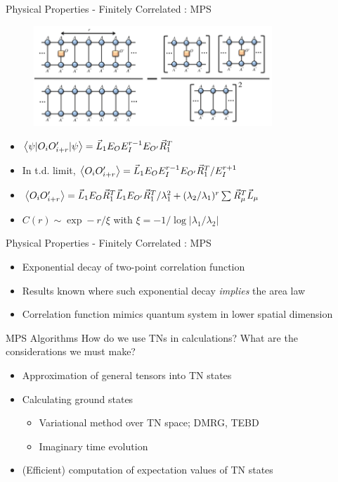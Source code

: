 \documentclass{beamer}
\begin{document}
\begin{frame}{Physical Properties - Finitely Correlated : MPS}
	\begin{figure}[h]
	\includegraphics[width=0.8\textwidth]{corr}
	\centering
	\end{figure}
\begin{itemize}
\item ${ \ev{\psi |O_{i}O^{\prime}_{i+r}|\psi }=\vec{L}_{1}E_{O}E_{I}^{r-1}E_{O^{\prime}} \vec{R}_{1}^{T}}$\\
	\item	In t.d. limit, ${ \ev{O_{i}O^{\prime}_{i+r}}=\vec{L}_{1}E_{O}E_{I}^{r-1}E_{O^{\prime}}\vec{R}_{1}^{T}/E_{I}^{r+1}}$
	\item ${ \ev{O_{i}O_{i+r}^{\prime}}=\vec{L}_{1}E_{O}\vec{R}_{1}^{T}\vec{L}_{1}E_{O^{\prime}}\vec{R}_{1}^{T}/\lambda _{1}^{2} +(\lambda _{2}/\lambda _{1})^{r}\sum_{}^{} \vec{R}^{T}_{\mu} \vec{L}_{\mu }}$
	\item ${ C(r)\sim \exp -r/\xi }$ with ${ \xi =-1  /\log{|\lambda _{1}/\lambda _{2}|}}$

\end{itemize}
\end{frame}

\begin{frame}{Physical Properties - Finitely Correlated : MPS}
	\begin{itemize}
	\item Exponential decay of two-point correlation function
	\item Results known where such exponential decay \textit{implies} the area law
	\item Correlation function mimics quantum system in lower spatial dimension
	\end{itemize}
\end{frame}

\begin{frame}{MPS Algorithms}
		How do we use TNs in calculations? What are the considerations we must make?
		\vspace{.5cm}
	\begin{itemize}
	\item Approximation of general tensors into TN states
	\item Calculating ground states
		\begin{itemize}
		\item Variational method over TN space; DMRG, TEBD
		\item Imaginary time evolution
		\end{itemize}
	\item (Efficient) computation of expectation values of TN states
	\end{itemize}
\end{frame}
\end{document}
